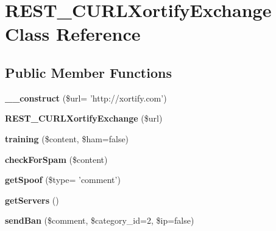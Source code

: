 \hypertarget{class_r_e_s_t___c_u_r_l_xortify_exchange}{\section{R\-E\-S\-T\-\_\-\-C\-U\-R\-L\-Xortify\-Exchange Class Reference}
\label{class_r_e_s_t___c_u_r_l_xortify_exchange}
}
\subsection*{Public Member Functions}
\begin{DoxyCompactItemize}
\item 
\hypertarget{class_r_e_s_t___c_u_r_l_xortify_exchange_a7e608806a20684501aff2f60297af2d8}{{\bfseries \-\_\-\-\_\-construct} (\$url= 'http\-://xortify.\-com')}\label{class_r_e_s_t___c_u_r_l_xortify_exchange_a7e608806a20684501aff2f60297af2d8}

\item 
\hypertarget{class_r_e_s_t___c_u_r_l_xortify_exchange_a05ab23b517aafa4227ad4965e2f2ecfc}{{\bfseries R\-E\-S\-T\-\_\-\-C\-U\-R\-L\-Xortify\-Exchange} (\$url)}\label{class_r_e_s_t___c_u_r_l_xortify_exchange_a05ab23b517aafa4227ad4965e2f2ecfc}

\item 
\hypertarget{class_r_e_s_t___c_u_r_l_xortify_exchange_a8172c35ea524ed34842f9181fd1f77e1}{{\bfseries training} (\$content, \$ham=false)}\label{class_r_e_s_t___c_u_r_l_xortify_exchange_a8172c35ea524ed34842f9181fd1f77e1}

\item 
\hypertarget{class_r_e_s_t___c_u_r_l_xortify_exchange_ae273dc6fe9d19e4bd72573be3f01636d}{{\bfseries check\-For\-Spam} (\$content)}\label{class_r_e_s_t___c_u_r_l_xortify_exchange_ae273dc6fe9d19e4bd72573be3f01636d}

\item 
\hypertarget{class_r_e_s_t___c_u_r_l_xortify_exchange_a5f3247b1d28c8df7809e3897a49631cf}{{\bfseries get\-Spoof} (\$type= 'comment')}\label{class_r_e_s_t___c_u_r_l_xortify_exchange_a5f3247b1d28c8df7809e3897a49631cf}

\item 
\hypertarget{class_r_e_s_t___c_u_r_l_xortify_exchange_a41e782010f1f821dcefc499ba5f4a257}{{\bfseries get\-Servers} ()}\label{class_r_e_s_t___c_u_r_l_xortify_exchange_a41e782010f1f821dcefc499ba5f4a257}

\item 
\hypertarget{class_r_e_s_t___c_u_r_l_xortify_exchange_afaa6fc0001813f49f5189bc19cb5452e}{{\bfseries send\-Ban} (\$comment, \$category\-\_\-id=2, \$ip=false)}\label{class_r_e_s_t___c_u_r_l_xortify_exchange_afaa6fc0001813f49f5189bc19cb5452e}


\end{DoxyCompactItemize}
